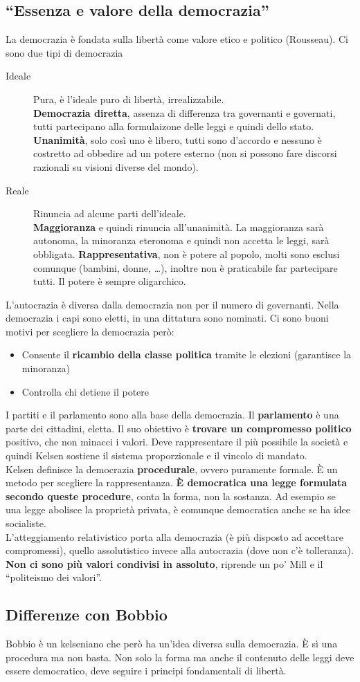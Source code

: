\subsection{``Essenza e valore della democrazia''}
La democrazia è fondata sulla libertà come valore etico e politico (Rousseau). Ci sono due tipi di
democrazia
\begin{description}
  \item[Ideale] Pura, è l'ideale puro di libertà, irrealizzabile.\\
    \textbf{Democrazia diretta}, assenza di differenza tra governanti e governati, tutti partecipano
    alla formulaizone delle leggi e quindi dello stato. \textbf{Unanimità}, solo così uno è libero,
    tutti sono d'accordo e nessuno è costretto ad obbedire ad un potere esterno (non si possono fare
    discorsi razionali su visioni diverse del mondo).
  \item[Reale] Rinuncia ad alcune parti dell'ideale.\\
    \textbf{Maggioranza} e quindi rinuncia all'unanimità. La maggioranza sarà autonoma, la minoranza
    eteronoma e quindi non accetta le leggi, sarà obbligata. \textbf{Rappresentativa}, non è potere
    al popolo, molti sono esclusi comunque (bambini, donne, \ldots), inoltre non è praticabile far
    partecipare tutti. Il potere è sempre oligarchico.
\end{description}
L'autocrazia è diversa dalla democrazia non per il numero di governanti. Nella democrazia i capi 
sono eletti, in una dittatura sono nominati. Ci sono buoni motivi per scegliere la democrazia però:
\begin{itemize}
  \item Consente il \textbf{ricambio della classe politica} tramite le elezioni (garantisce la
    minoranza)
  \item Controlla chi detiene il potere
\end{itemize}
I partiti e il parlamento sono alla base della democrazia. Il \textbf{parlamento} è una parte dei
cittadini, eletta. Il suo obiettivo è \textbf{trovare un compromesso politico} positivo, che non
minacci i valori. Deve rappresentare il più possibile la società e quindi Kelsen sostiene il
sistema proporzionale e il vincolo di mandato.\\
Kelsen definisce la democrazia \textbf{procedurale}, ovvero puramente formale. È un metodo per 
scegliere la rappresentanza. \textbf{È democratica una legge formulata secondo queste procedure}, 
conta la forma, non la sostanza. Ad esempio se una legge abolisce la proprietà privata, è comunque
democratica anche se ha idee socialiste.\\
L'atteggiamento relativistico porta alla democrazia (è più disposto ad accettare compromessi),
quello assolutistico invece alla autocrazia (dove non c'è tolleranza). \textbf{Non ci sono più valori
condivisi in assoluto}, riprende un po' Mill e il ``politeismo dei valori''.

\subsection{Differenze con Bobbio}
Bobbio è un kelseniano che però ha un'idea diversa sulla democrazia. È sì una procedura ma non basta.
Non solo la forma ma anche il contenuto delle leggi deve essere democratico, deve seguire i principi
fondamentali di libertà.
